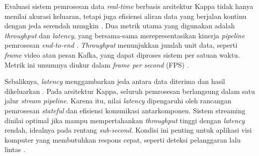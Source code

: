 Evaluasi sistem pemrosesan data \textit{real-time} berbasis arsitektur Kappa
tidak hanya menilai akurasi keluaran, tetapi juga efisiensi aliran data yang
berjalan kontinu dengan jeda serendah mungkin
\cite{kreps2014questioning}. Dua metrik utama yang digunakan adalah
\textit{throughput} dan \textit{latency}, yang bersama-sama merepresentasikan
kinerja \textit{pipeline} pemrosesan \textit{end-to-end}
\cite{kleppmann2017designing}. \textit{Throughput} menunjukkan jumlah unit
data, seperti \textit{frame} video atau pesan Kafka, yang dapat diproses
sistem per satuan waktu. Metrik ini umumnya diukur dalam
\textit{frame per second} (FPS) \cite{marz2015big}.

Sebaliknya, \textit{latency} menggambarkan jeda antara data diterima dan hasil
dikeluarkan \cite{kleppmann2017designing}. Pada arsitektur Kappa, seluruh
pemrosesan berlangsung dalam satu jalur \textit{stream pipeline}. Karena itu,
nilai \textit{latency} dipengaruhi oleh rancangan pemrosesan
\textit{stateful} dan efisiensi komunikasi antarkomponen. Sistem streaming
dinilai optimal jika mampu mempertahankan \textit{throughput} tinggi dengan
\textit{latency} rendah, idealnya pada rentang \textit{sub-second}. Kondisi
ini penting untuk aplikasi visi komputer yang membutuhkan respons cepat,
seperti deteksi pelanggaran lalu lintas \cite{kreps2014questioning}.
